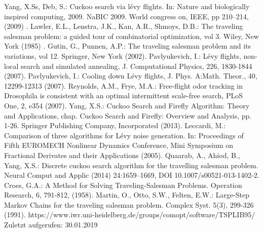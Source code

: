 \documentclass[conference]{IEEEtran}
\begin{document}
  \begin{thebibliography}{00}
   Yang, X.Ss, Deb, S.: Cuckoo search via lévy flights. In: Nature and biologically inspired computing, 2009. NaBIC 2009. World congress on, IEEE, pp 210–214, (2009) .
   Lawler, E.L., Lenstra, J.K., Kan, A.R., Shmoys, D.B.: The traveling salesman problem: a guided tour of combinatorial optimization, vol 3. Wiley, New York (1985) .
   Gutin, G., Punnen, A.P.: The traveling salesman problem and its variations, vol 12. Springer, New York (2002).
   Pavlyukevich, I.: Lévy flights, non-local search and simulated annealing, J. Computational Physics, 226, 1830-1844 (2007).
   Pavlyukevich, I.: Cooling down Lévy flights, J. Phys. A:Math. Theor., 40, 12299-12313 (2007).
   Reynolds, A.M., Frye, M.A.: Free-flight odor tracking in Drosophila is consistent with an optimal intermittent scale-free search, PLoS One, 2, e354 (2007).
   Yang, X.S.: Cuckoo Search and Firefly Algorithm: Theory and Applications, chap. Cuckoo Search and Firefly: Overview and Analysis, pp. 1-26. Springer Publishing Company, Incorporated (2013).
   Leccardi, M.: Comparison of three algorithms for Lévy noise generation. In: Proceedings of Fifth EUROMECH Nonlinear Dynamics Conference, Mini Symposium on Fractional Derivates and their Applications (2005).
   Quaarab, A., Ahiod, B., Yang, X.S.: Discrete cuckoo search algorithm for the travelling salesman problem. Neural Comput and Applic (2014) 24:1659–1669, DOI 10.1007/s00521-013-1402-2.
   Croes, G.A.: A Method for Solving Traveling-Salesman Problems. Operation Research, 6, 791-812, (1958). 
   Martin, O., Otto, S.W., Felten, E.W.: Large-Step Markov Chains for the traveling salesman problem. Complex Syst. 5(3), 299-326 (1991).
   https://www.iwr.uni-heidelberg.de/groups/comopt/software/TSPLIB95/ Zuletzt aufgerufen: 30.01.2019
      

  \end{thebibliography}
\end{document}
